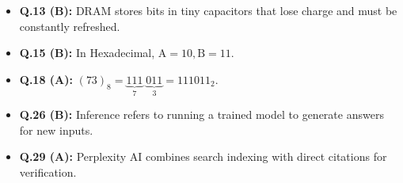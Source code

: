 \begin{expbox}
\begin{itemize}[leftmargin=5mm]
    \item \textbf{Q.13 (B):} DRAM stores bits in tiny capacitors that lose charge and must be constantly refreshed.
    \item \textbf{Q.15 (B):} In Hexadecimal, $\text{A}=10, \text{B}=11$.
    \item \textbf{Q.18 (A):} $(73)_8 = \underbrace{111}_{7}\;\underbrace{011}_{3} = 111011_2$.
    \item \textbf{Q.26 (B):} Inference refers to running a trained model to generate answers for new inputs.
    \item \textbf{Q.29 (A):} Perplexity AI combines search indexing with direct citations for verification.
\end{itemize}
\end{expbox}

\newpage
